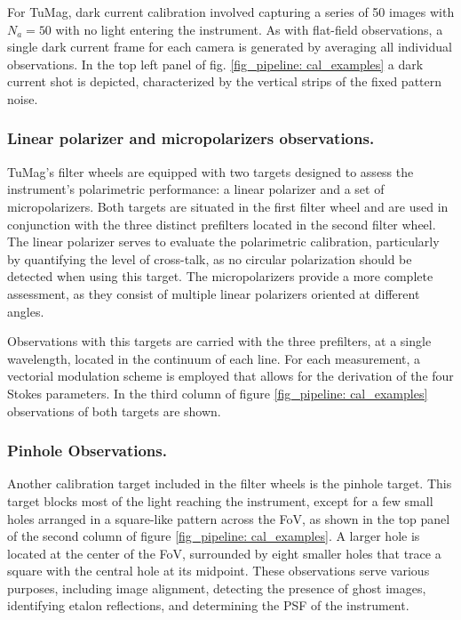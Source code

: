 For TuMag, dark current calibration involved capturing a series of 50 images with $N_a = 50$ with no light entering the instrument. As with flat-field observations, a single dark current frame for each camera is generated by averaging all individual observations. In the top left panel of fig. \ref{fig_pipeline: cal_examples} a dark current shot is depicted, characterized by the vertical strips of the fixed pattern noise.  

\subsubsection{Linear polarizer and micropolarizers observations.}

TuMag's filter wheels are equipped with two targets designed to assess the instrument's polarimetric performance: a linear polarizer and a set of micropolarizers. Both targets are situated in the first filter wheel and are used in conjunction with the three distinct prefilters located in the second filter wheel. The linear polarizer serves to evaluate the polarimetric calibration, particularly by quantifying the level of cross-talk, as no circular polarization should be detected when using this target. The micropolarizers provide a more complete assessment, as they consist of multiple linear polarizers oriented at different angles. 

Observations with this targets are carried with the three prefilters, at a single wavelength, located in the continuum of each line. For each measurement, a vectorial modulation scheme is employed that allows for the derivation of the four Stokes parameters. In the third column of figure \ref{fig_pipeline: cal_examples} observations of both targets are shown. 

\subsubsection{Pinhole Observations.}

Another calibration target included in the filter wheels is the pinhole target. This target blocks most of the light reaching the instrument, except for a few small holes arranged in a square-like pattern across the FoV, as shown in the top panel of the second column of figure \ref{fig_pipeline: cal_examples}. A larger hole is located at the center of the FoV, surrounded by eight smaller holes that trace a square with the central hole at its midpoint. These observations serve various purposes, including image alignment, detecting the presence of ghost images, identifying etalon reflections, and determining the PSF of the instrument.

